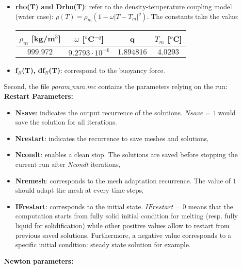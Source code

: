    \begin{itemize} 
    \item {\bf rho(T) and Drho(T)}: refer to the density-temperature coupling model (water case): 
    $\rho(T) = \rho_m (1 - \omega | T - T_m |^q)$. The constants take the value:
    \begin{table}[!ht]
    \centering
    \begin{tabular}{*{4}{c}}
    $\rho_m$ [kg/m$^3$]  & $\omega$ [$^o$C$^{-q}$] & q & $T_m$  [$^o$C] \\
       \toprule
            $999.972$ & $9.2793 \cdot 10^{-6}$ & $1.894816$ & $4.0293$ \\
       \bottomrule
     \end{tabular}
    \label{tab-rho}
    \end{table}
    \item {\bf f$_B$(T), df$_B$(T)}: correspond to the buoyancy force.%
    \end{itemize}
 Second, the file {\em param$\_$num.inc} contains the parameters relying on the run:\\
{\bf Restart Parameters:}
\begin{itemize}
   \item {\bf Nsave}: indicates the output recurrence of the solutions. $N\!save = 1$ would save the solution for all iterations.
   \item {\bf Nrestart}: indicates the recurrence to save meshes and solutions,
   \item {\bf Ncondt}: enables a clean stop. The solutions are saved before stopping the current run after {\it Ncondt} iterations,
   \item {\bf Nremesh}: corresponds to the mesh adaptation recurrence. The value of $1$ should adapt the mesh at every time steps,
   \item {\bf IFrestart}: corresponds to the initial state. 
   $I\!Frestart = 0$ means that the computation starts from fully solid initial condition for melting (resp. fully liquid for solidification) while other positive values allow to restart from previous saved solutions. 
   Furthermore, a negative value corresponds to a specific initial condition: steady state solution for example.
\end{itemize}
{\bf Newton parameters:}
